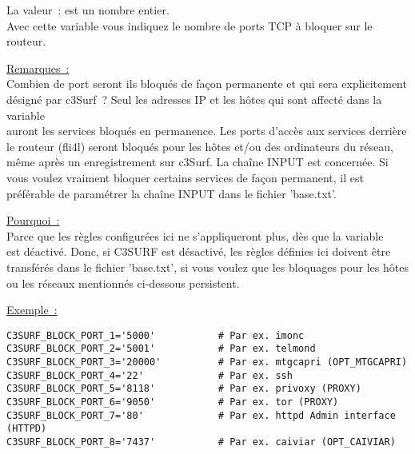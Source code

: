 \begin{itemize}
\begin{description}


  La valeur~: est un nombre entier.\\
  Avec cette variable vous indiquez le nombre de ports TCP à bloquer sur le routeur.

   \underline{Remarques~:}\\
   Combien de port seront ils bloqués de façon permanente et qui sera explicitement
   désigné par c3Surf~? Seul les adresses IP et les hôtes qui sont affecté dans la variable\\
   auront les services bloqués en permanence. Les ports d'accès aux services derrière
   le routeur (fli4l) seront bloqués pour les hôtes et/ou des ordinateurs du réseau,
   même après un enregistrement sur c3Surf. La chaîne INPUT est concernée. Si vous voulez
   vraiment bloquer certains services de façon permanent, il est préférable de paramétrer
   la chaîne INPUT dans le fichier 'base.txt'.

   \underline{Pourquoi~:}\\
   Parce que les règles configurées ici ne s'appliqueront plus, dès que la variable\\
    est déactivé. Donc, si C3SURF est désactivé,
   les règles définies ici doivent être transférés dans le fichier 'base.txt', si vous
   voulez que les bloquages pour les hôtes ou les réseaux mentionnés ci-dessous persistent.



\underline{Exemple~:}
\begin{example}
\begin{verbatim}
C3SURF_BLOCK_PORT_1='5000'           # Par ex. imonc
C3SURF_BLOCK_PORT_2='5001'           # Par ex. telmond
C3SURF_BLOCK_PORT_3='20000'          # Par ex. mtgcapri (OPT_MTGCAPRI)
C3SURF_BLOCK_PORT_4='22'             # Par ex. ssh
C3SURF_BLOCK_PORT_5='8118'           # Par ex. privoxy (PROXY)
C3SURF_BLOCK_PORT_6='9050'           # Par ex. tor (PROXY)
C3SURF_BLOCK_PORT_7='80'             # Par ex. httpd Admin interface (HTTPD)
C3SURF_BLOCK_PORT_8='7437'           # Par ex. caiviar (OPT_CAIVIAR)
\end{verbatim}
\end{example}


\end{description}
\end{itemize}
